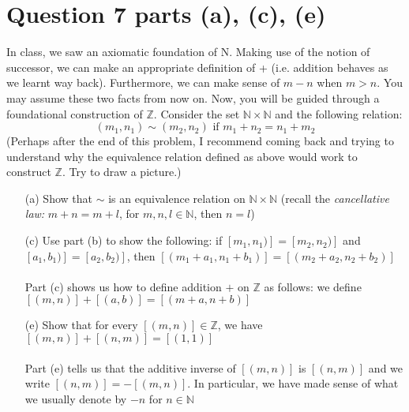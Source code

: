 \documentclass[13pt]{article}
\begin{document}
\section{Question 7 parts (a), (c), (e)}
In class, we saw an axiomatic foundation of N. Making use of the notion of successor, we can make an appropriate
definition of + (i.e. addition behaves as we learnt way back). Furthermore, we can make sense of $m - n$ when
$m > n$. You may assume these two facts from now on. Now, you will be guided through a foundational construction
of $\mathbb{Z}$. Consider the set $\mathbb{N} \times \mathbb{N}$ and the following relation:
\[(m_1, n_1) \sim (m_2, n_2) \text{ if } m_1 + n_2 = n_1 + m_2\]
(Perhaps after the end of this problem, I recommend coming back and trying to understand why the equivalence
relation defined as above would work to construct $\mathbb{Z}$. Try to draw a picture.)
\begin{enumerate}
\item [(a)] Show that $\sim$ is an equivalence relation on $\mathbb{N} \times \mathbb{N}$ (recall the
  \textit{cancellative law:} $m + n = m + l$, for $m, n, l \in \mathbb{N}$, then $n = l$)
\item [(c)] Use part (b) to show the following: if $[m_1, n_1)] = [m_2, n_2)]$ and $[a_1, b_1)] = [a_2, b_2)]$,
  then $[(m_1 + a_1, n_1 + b_1)] = [(m_2 + a_2, n_2 + b_2)]$ \\ \\
  Part (c) shows us how to define addition $+$ on $\mathbb{Z}$ as follows: we define $[(m, n)] + [(a, b)] =
  [(m + a, n + b)]$
\item [(e)] Show that for every $[(m, n)] \in \mathbb{Z}$, we have $[(m, n)] + [(n, m)] = [(1, 1)]$ \\ \\
  Part (e) tells us that the additive inverse of $[(m, n)]$ is $[(n, m)]$ and we write $[(n, m)] = -[(m, n)]$.
  In particular, we have made sense of what we usually denote by $-n$ for $n \in \mathbb{N}$
\end{enumerate}
\end{document}
